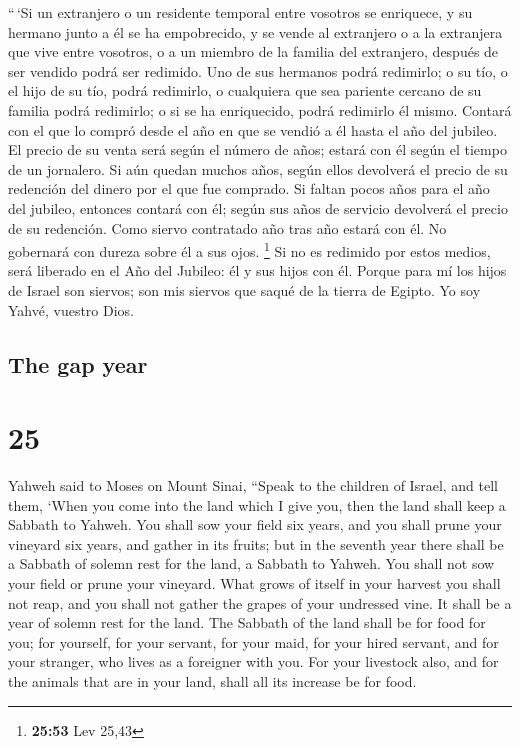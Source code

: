 \begin{paracol}{2}
 ``\,`Si un extranjero o un residente temporal entre
vosotros se enriquece, y su hermano junto a él se ha empobrecido, y se
vende al extranjero o a la extranjera que vive entre vosotros, o a un
miembro de la familia del extranjero,  después de ser
vendido podrá ser redimido. Uno de sus hermanos podrá redimirlo;
 o su tío, o el hijo de su tío, podrá redimirlo, o
cualquiera que sea pariente cercano de su familia podrá redimirlo; o si
se ha enriquecido, podrá redimirlo él mismo.  Contará con
el que lo compró desde el año en que se vendió a él hasta el año del
jubileo. El precio de su venta será según el número de años; estará con
él según el tiempo de un jornalero.  Si aún quedan muchos
años, según ellos devolverá el precio de su redención del dinero por el
que fue comprado.  Si faltan pocos años para el año del
jubileo, entonces contará con él; según sus años de servicio devolverá
el precio de su redención.  Como siervo contratado año
tras año estará con él. No gobernará con dureza sobre él a sus ojos.
\footnote{\textbf{25:53} Lev 25,43}  Si no es redimido
por estos medios, será liberado en el Año del Jubileo: él y sus hijos
con él.  Porque para mí los hijos de Israel son siervos;
son mis siervos que saqué de la tierra de Egipto. Yo soy Yahvé, vuestro
Dios.

\switchcolumn
\begin{otherlanguage}{english}

\hypertarget{the-gap-year}{%
\subsection{The gap year}\label{the-gap-year}}

\hypertarget{section-49}{%
\section{25}\label{section-49}}

 Yahweh said to Moses on Mount Sinai, 
``Speak to the children of Israel, and tell them, `When you come into
the land which I give you, then the land shall keep a Sabbath to Yahweh.
 You shall sow your field six years, and you shall prune
your vineyard six years, and gather in its fruits;  but in
the seventh year there shall be a Sabbath of solemn rest for the land, a
Sabbath to Yahweh. You shall not sow your field or prune your vineyard.
 What grows of itself in your harvest you shall not reap,
and you shall not gather the grapes of your undressed vine. It shall be
a year of solemn rest for the land.  The Sabbath of the
land shall be for food for you; for yourself, for your servant, for your
maid, for your hired servant, and for your stranger, who lives as a
foreigner with you.  For your livestock also, and for the
animals that are in your land, shall all its increase be for food.


\end{otherlanguage}
\end{paracol}
